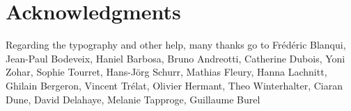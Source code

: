 

\bigskip

\begingroup
\let\clearpage\relax
\let\cleardoublepage\relax
\let\cleardoublepage\relax
\chapter*{Acknowledgments}

Regarding the typography and other help, many thanks go to Frédéric Blanqui, Jean-Paul Bodeveix, Haniel Barbosa, Bruno Andreotti,
Catherine Dubois, Yoni Zohar, Sophie Tourret, Hans-Jörg Schurr, Mathias Fleury, Hanna Lachnitt, Ghilain Bergeron, Vincent Trélat, Olivier Hermant,
Theo Winterhalter, Ciaran Dune, David Delahaye, Melanie Tapproge, Guillaume Burel 




\endgroup



